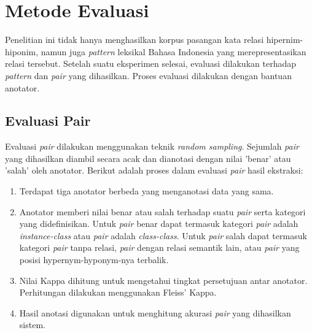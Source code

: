 \section{Metode Evaluasi}
Penelitian ini tidak hanya menghasilkan korpus pasangan kata relasi hipernim-hiponim, namun juga \textit{pattern} leksikal Bahasa Indonesia yang merepresentasikan relasi tersebut. Setelah suatu eksperimen selesai, evaluasi dilakukan terhadap \textit{pattern} dan \textit{pair} yang dihasilkan. Proses evaluasi dilakukan dengan bantuan anotator.

\subsection{Evaluasi Pair}
Evaluasi \textit{pair} dilakukan menggunakan teknik \textit{random sampling}. Sejumlah \textit{pair} yang dihasilkan diambil secara acak dan dianotasi dengan nilai 'benar' atau 'salah' oleh anotator. Berikut adalah proses dalam evaluasi \textit{pair} hasil ekstraksi:
\begin{enumerate}
  \item Terdapat tiga anotator berbeda yang menganotasi data yang sama. 
  \item Anotator memberi nilai benar atau salah terhadap suatu \textit{pair} serta kategori yang didefinisikan. Untuk \textit{pair} benar dapat termasuk kategori \textit{pair} adalah \textit{instance-class} atau \textit{pair} adalah \textit{class-class}. Untuk \textit{pair} salah dapat termasuk kategori \textit{pair} tanpa relasi, \textit{pair} dengan relasi semantik lain, atau \textit{pair} yang posisi hypernym-hyponym-nya terbalik. 
  \item Nilai Kappa dihitung untuk mengetahui tingkat persetujuan antar anotator. Perhitungan dilakukan menggunakan Fleiss' Kappa.
  \item Hasil anotasi digunakan untuk menghitung akurasi \textit{pair} yang dihasilkan sistem.
\end{enumerate}

